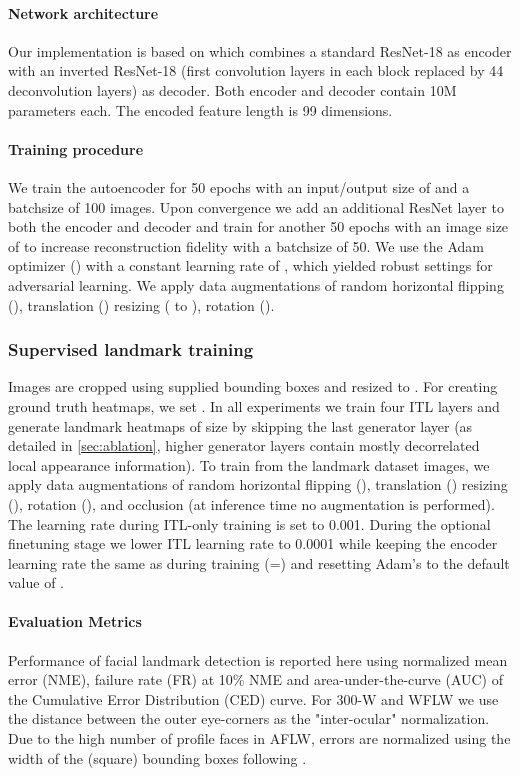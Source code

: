 \documentclass[10pt,twocolumn,letterpaper]{article}
\begin{document}
\paragraph{Network architecture}
Our implementation is based on \cite{browatzki2019robust} which combines a standard ResNet-18 as encoder with an inverted ResNet-18 (first convolution layers in each block replaced by 44 deconvolution layers) as decoder. Both encoder and decoder contain 10M parameters each. The encoded feature length is 99 dimensions. 

\vspace{-0.3cm}\paragraph{Training procedure}
We train the autoencoder for 50 epochs with an input/output size of  and a batchsize of 100 images. Upon convergence we add an additional ResNet layer to both the encoder and decoder and train for another 50 epochs with an image size of  to increase reconstruction fidelity with a batchsize of 50. We use the Adam optimizer \cite{kingma2014adam} () with a constant learning rate of , which yielded robust settings for adversarial learning.
We apply data augmentations of random horizontal flipping (), translation () resizing ( to ), rotation ().

\vspace{-0.2cm}\subsubsection{Supervised landmark training}
Images are cropped using supplied bounding boxes and resized to . For creating ground truth heatmaps, we set .  In all experiments we train four ITL layers and generate landmark heatmaps of size  by skipping the last generator layer (as detailed in \ref{sec:ablation}, higher generator layers contain mostly decorrelated local appearance information).
To train from the landmark dataset images, we apply data augmentations of random horizontal flipping (), translation () resizing (), rotation (), and occlusion (at inference time no augmentation is performed).
The learning rate during ITL-only training is set to 0.001. During the optional finetuning stage we lower ITL learning rate to 0.0001 while keeping the encoder learning rate the same as during training (=) and resetting Adam's  to the default value of .




\vspace{-0.2cm}\paragraph{Evaluation Metrics} Performance of facial landmark detection is reported here using normalized mean error (NME), failure rate (FR) at 10\% NME and area-under-the-curve (AUC) of the Cumulative Error Distribution (CED) curve. For 300-W and WFLW we use the distance between the outer eye-corners as the "inter-ocular" normalization. Due to the high number of profile faces in AFLW, errors are normalized using the width of the (square) bounding boxes following \cite{zhu2015face}.
\end{document}
